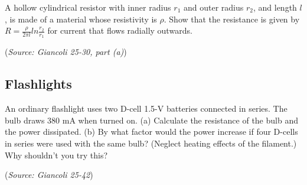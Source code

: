 \documentclass{article}
\begin{document}
A hollow cylindrical resistor with inner radius $r_1$ and outer radius $r_2$, and length $l$, is made of a material whose resistivity is $\rho$. Show that the resistance is given by $R=\frac{\rho}{2\pi l}ln\frac{r_2}{r_1}$ for current that flows radially outwards.

(\textit{Source: Giancoli 25-30, part (a)})

\subsection{Flashlights}

An ordinary flashlight uses two D-cell 1.5-V batteries connected in series. The bulb draws 380 mA when turned on. (a) Calculate the resistance of the bulb and the power dissipated. (b) By what factor would the power increase if four D-cells in series were used with the same bulb? (Neglect heating effects of the filament.) Why shouldn't you try this?

(\textit{Source: Giancoli 25-42})
\end{document}
